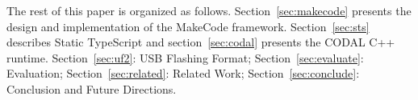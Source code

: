 
The rest of this paper is organized as follows. Section~\ref{sec:makecode} presents the design and implementation of the MakeCode framework. 
Section~\ref{sec:sts} describes Static TypeScript and section~\ref{sec:codal} presents the CODAL C++ runtime. 
Section~\ref{sec:uf2}: USB Flashing Format;
Section~\ref{sec:evaluate}: Evaluation;
Section~\ref{sec:related}: Related Work;
Section~\ref{sec:conclude}: Conclusion and Future Directions. 
